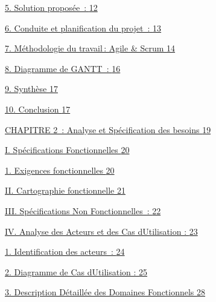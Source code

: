 \documentclass[12pt,a4paper,twoside]{report}
\begin{document}
\protect\hyperlink{solution-proposuxe9e}{5. Solution proposée~:
\protect\hyperlink{solution-proposuxe9e}{12}}

\protect\hyperlink{conduite-et-planification-du-projet}{6. Conduite et
planification du projet~:
\protect\hyperlink{conduite-et-planification-du-projet}{13}}

\protect\hyperlink{muxe9thodologie-du-travail-agile-scrum}{7.
Méthodologie du travail\,: Agile \& Scrum
\protect\hyperlink{muxe9thodologie-du-travail-agile-scrum}{14}}

\protect\hyperlink{diagramme-de-gantt}{8. Diagramme de GANTT~:
\protect\hyperlink{diagramme-de-gantt}{16}}

\protect\hyperlink{synthuxe8se}{9. Synthèse
\protect\hyperlink{synthuxe8se}{17}}

\protect\hyperlink{conclusion}{10. Conclusion
\protect\hyperlink{conclusion}{17}}

\protect\hyperlink{section-2}{CHAPITRE 2~: Analyse et Spécification des
besoins \protect\hyperlink{section-2}{19}}

\protect\hyperlink{spuxe9cifications-fonctionnelles}{I. Spécifications
Fonctionnelles \protect\hyperlink{spuxe9cifications-fonctionnelles}{20}}

\protect\hyperlink{exigences-fonctionnelles}{1. Exigences fonctionnelles
\protect\hyperlink{exigences-fonctionnelles}{20}}

\protect\hyperlink{cartographie-fonctionnelle}{II. Cartographie
fonctionnelle \protect\hyperlink{cartographie-fonctionnelle}{21}}

\protect\hyperlink{spuxe9cifications-non-fonctionnelles}{III.
Spécifications Non Fonctionnelles~:
\protect\hyperlink{spuxe9cifications-non-fonctionnelles}{22}}

\protect\hyperlink{analyse-des-acteurs-et-des-cas-dutilisation}{IV.
Analyse des Acteurs et des Cas d\textquotesingle Utilisation :
\protect\hyperlink{analyse-des-acteurs-et-des-cas-dutilisation}{23}}

\protect\hyperlink{identification-des-acteurs}{1. Identification des
acteurs~: \protect\hyperlink{identification-des-acteurs}{24}}

\protect\hyperlink{diagramme-de-cas-dutilisation}{2. Diagramme de Cas
d\textquotesingle Utilisation :
\protect\hyperlink{diagramme-de-cas-dutilisation}{25}}

\protect\hyperlink{description-duxe9tailluxe9e-des-domaines-fonctionnels}{3.
Description Détaillée des Domaines Fonctionnels
\protect\hyperlink{description-duxe9tailluxe9e-des-domaines-fonctionnels}{28}}
\end{document}
